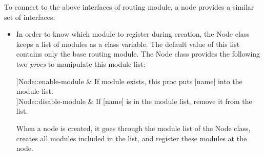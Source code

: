To connect to the above interfaces of routing module, a node provides
a similar set of interfaces:
\begin{itemize}
\item %
  In order to know which module to register during creation, the Node
  class keeps a list of modules as a class variable. 
  The default value of this list contains only the base routing
  module.
  The Node class provides the following two {\em procs} to manipulate
  this module list:
  \begin{alist}
    {\let\[=[\let\]=] \proc[\[name\]]{Node::enable-module}} & If module
     exists, this proc puts [name] into the
    module list. \\ 
    {\let\[=[\let\]=]\proc[\[name\]]{Node::disable-module}} & If
    [name] is in the module 
    list, remove it from the list. 
  \end{alist}
  When a node is created, it goes through the module list of the Node
  class, creates all modules included in the list, and register these
  modules at the node.


\end{itemize}
